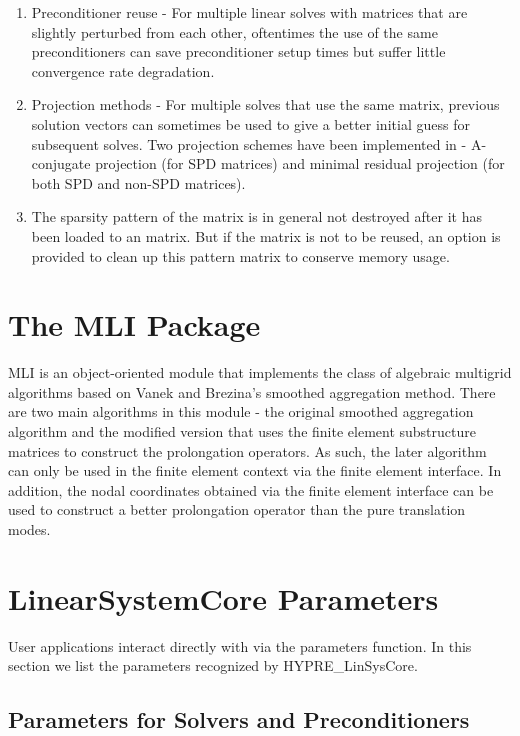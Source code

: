 \begin{enumerate}
\item Preconditioner reuse - For multiple linear solves with matrices that are
      slightly perturbed from each other, oftentimes the use of the same 
      preconditioners can save preconditioner setup times but suffer little
      convergence rate degradation.
\item Projection methods - For multiple solves that use the same matrix,
      previous solution vectors can sometimes be used to give a better initial
      guess for subsequent solves.  Two projection schemes have been implemented
      in \hypre{} - A-conjugate projection (for SPD matrices) and minimal residual
      projection (for both SPD and non-SPD matrices).
\item The sparsity pattern of the matrix is in general not destroyed after
      it has been loaded to an \hypre{} matrix.  But if the matrix is not to
      be reused, an option is provided to clean up this pattern matrix to
      conserve memory usage.
\end{enumerate}

\section{The MLI Package}

MLI is an object-oriented module that implements the class of algebraic
multigrid algorithms based on Vanek and Brezina's smoothed aggregation
method.  There are two main algorithms in this module - the original
smoothed aggregation algorithm and the modified version that uses
the finite element substructure matrices to construct the prolongation
operators.  As such, the later algorithm can only be used in the
finite element context via the finite element interface.  In addition,
the nodal coordinates obtained via the finite element interface can be
used to construct a better prolongation operator than the pure 
translation modes.

\section{\hypre{} LinearSystemCore Parameters}

User applications interact directly with \hypre{} via the {\sf parameters}
function. In this section we list the parameters recognized by
{\sf HYPRE\_LinSysCore}.

\subsection{Parameters for Solvers and Preconditioners}

